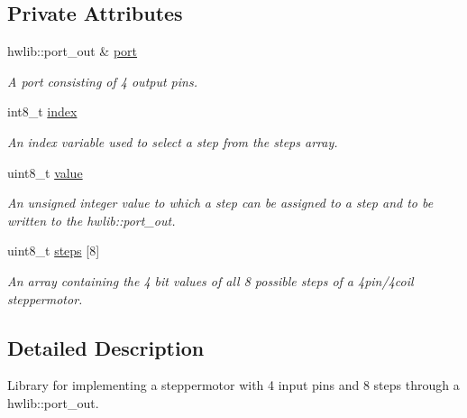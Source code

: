 \subsection*{Private Attributes}
\begin{DoxyCompactItemize}
\item 
\mbox{\label{classsteppermotor_a46084d0eae151993b4da56d9de1136d9}} 
hwlib\+::port\+\_\+out \& \hyperlink{classsteppermotor_a46084d0eae151993b4da56d9de1136d9}{port}
\begin{DoxyCompactList}\small\item\em A port consisting of 4 output pins. \end{DoxyCompactList}\item 
\mbox{\label{classsteppermotor_a2f2aed2cb0cc3d19c72c78c65c943f34}} 
int8\+\_\+t \hyperlink{classsteppermotor_a2f2aed2cb0cc3d19c72c78c65c943f34}{index}
\begin{DoxyCompactList}\small\item\em An index variable used to select a step from the steps array. \end{DoxyCompactList}\item 
\mbox{\label{classsteppermotor_a0d91584a6e56e47f5875ad52b6a6d8d0}} 
uint8\+\_\+t \hyperlink{classsteppermotor_a0d91584a6e56e47f5875ad52b6a6d8d0}{value}
\begin{DoxyCompactList}\small\item\em An unsigned integer value to which a step can be assigned to a step and to be written to the hwlib\+::port\+\_\+out. \end{DoxyCompactList}\item 
\mbox{\label{classsteppermotor_a50c69d2ca2b0e46a18266b26bf7ff9e7}} 
uint8\+\_\+t \hyperlink{classsteppermotor_a50c69d2ca2b0e46a18266b26bf7ff9e7}{steps} \mbox{[}8\mbox{]}
\begin{DoxyCompactList}\small\item\em An array containing the 4 bit values of all 8 possible steps of a 4pin/4coil steppermotor. \end{DoxyCompactList}\end{DoxyCompactItemize}


\subsection{Detailed Description}
Library for implementing a steppermotor with 4 input pins and 8 steps through a hwlib\+::port\+\_\+out. 

